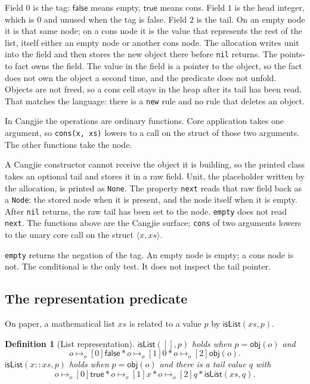 \documentclass[11pt]{article}
\newtheorem{definition}[theorem]{Definition}
\newcommand{\True}{\mathsf{true}}
\newcommand{\False}{\mathsf{false}}
\newcommand{\ptso}{\mathrel{\mapsto_{o}}}
\newcommand{\sep}{\mathbin{*}}
\begin{document}
Field \(0\) is the tag: \(\False\) means empty, \(\True\) means cons.
Field \(1\) is the head integer, which is \(0\) and unused when the tag is false.
Field \(2\) is the tail.
On an empty node it is that same node; on a cons node it is the value that represents the rest of the list, itself either an empty node or another cons node.
The allocation writes unit into the field and then stores the new object there before \texttt{nil} returns.
The points-to fact owns the field.
The value in the field is a pointer to the object, so the fact does not own the object a second time, and the predicate does not unfold.
Objects are not freed, so a cons cell stays in the heap after its tail has been read.
That matches the language: there is a \texttt{new} rule and no rule that deletes an object.

In Cangjie the operations are ordinary functions.
Core application takes one argument, so \texttt{cons(x, xs)} lowers to a call on the struct of those two arguments.
The other functions take the node.



A Cangjie constructor cannot receive the object it is building, so the printed class takes an optional tail and stores it in a raw field.
Unit, the placeholder written by the allocation, is printed as \texttt{None}.
The property \texttt{next} reads that raw field back as a \texttt{Node}: the stored node when it is present, and the node itself when it is empty.
After \texttt{nil} returns, the raw tail has been set to the node.
\texttt{empty} does not read \texttt{next}.
The functions above are the Cangjie surface; \texttt{cons} of two arguments lowers to the unary core call on the struct \(\langle x, xs\rangle\).

\texttt{empty} returns the negation of the tag.
An empty node is empty; a cons node is not.
The conditional is the only test.
It does not inspect the tail pointer.

\subsection{The representation predicate}

On paper, a mathematical list \(xs\) is related to a value \(p\) by \(\mathsf{isList}(xs, p)\).

\begin{definition}[List representation]
\(\mathsf{isList}([], p)\) holds when \(p = \mathsf{obj}(o)\) and
\[
o \ptso[0] \False
\sep
o \ptso[1] 0
\sep
o \ptso[2] \mathsf{obj}(o).
\]
\(\mathsf{isList}(x :: xs, p)\) holds when \(p = \mathsf{obj}(o)\) and there is a tail value \(q\) with
\[
o \ptso[0] \True
\sep
o \ptso[1] x
\sep
o \ptso[2] q
\sep
\mathsf{isList}(xs, q).
\]
\end{definition}
\end{document}
